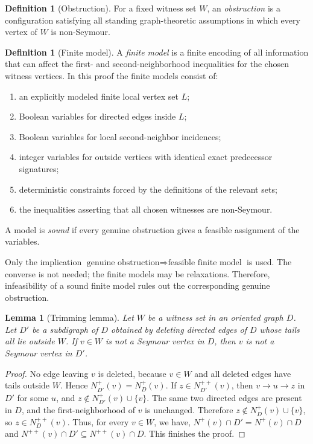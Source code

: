 \documentclass[a4paper,fleqn]{cas-sc}
\newtheorem{lemma}[theorem]{Lemma}
\theoremstyle{definition}
\newtheorem{definition}[theorem]{Definition}
\begin{document}
\begin{definition}[Obstruction]
For a fixed witness set $W$, an \emph{obstruction} is a configuration satisfying all standing graph-theoretic assumptions in which every vertex of $W$ is non-Seymour.
\end{definition}

\begin{definition}[Finite model]
A \emph{finite model} is a finite encoding of all information that can affect the first- and second-neighborhood inequalities for the chosen witness vertices. In this proof the finite models consist of:
\begin{enumerate}[label=(\roman*)]
\item an explicitly modeled finite local vertex set $L$;
\item Boolean variables for directed edges inside $L$;
\item Boolean variables for local second-neighbor incidences;
\item integer variables for outside vertices with identical exact predecessor signatures;
\item deterministic constraints forced by the definitions of the relevant sets;
\item the inequalities asserting that all chosen witnesses are non-Seymour.
\end{enumerate}
A model is \emph{sound} if every genuine obstruction gives a feasible assignment of the variables.
\end{definition}

Only the implication $\text{genuine obstruction}\Longrightarrow\text{feasible finite model}$
is used. The converse is not needed; the finite models may be relaxations. Therefore, infeasibility of a sound finite model rules out the corresponding genuine obstruction.

\begin{lemma}[Trimming lemma]\label{lem:trimming}
Let $W$ be a witness set in an oriented graph $D$.  Let $D'$ be a subdigraph of $D$ obtained by deleting directed edges of $D$ whose tails all lie outside $W$.  If $v\in W$ is not a Seymour vertex in $D$, then $v$ is not a Seymour vertex in $D'$.
\end{lemma}


\begin{proof}
No edge leaving $v$ is deleted, because $v\in W$ and all deleted edges have tails outside $W$.  Hence $N^+_{D'}(v)=N^+_D(v)$.  If $z\in N^{++}_{D'}(v)$, then $v\to u\to z$ in $D'$ for some $u$, and $z\notin N^+_{D'}(v)\cup\{v\}$.  The same two directed edges are present in $D$, and the first-neighborhood of $v$ is unchanged.  Therefore $z\notin N^+_D(v)\cup\{v\}$, so $z\in N^{++}_D(v)$. Thus, for every $v\in W$, we have, $N^+(v)\cap D'=N^+(v)\cap D$ and $N^{++}(v)\cap D'\subseteq N^{++}(v)\cap D$. This finishes the proof.
\end{proof}
\end{document}
